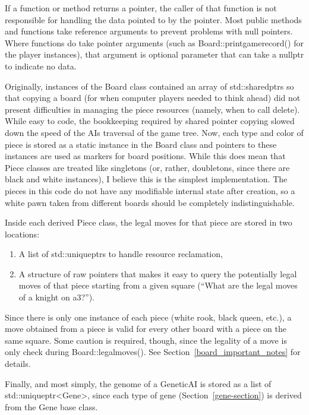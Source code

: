 \documentclass[letterpaper]{article}
\newcommand{\code}[1]{\textsf{#1}}
\renewcommand{\_}{\allowbreak\textunderscore\allowbreak}
\begin{document}
If a function or method returns a pointer, the caller of that function is not responsible for handling the data pointed to by the pointer. Most public methods and functions take reference arguments to prevent problems with null pointers. Where functions do take pointer arguments (such as \code{Board::print\_game\_record()} for the player instances), that argument is optional parameter that can take a \code{nullptr} to indicate no data.

Originally, instances of the \code{Board} class contained an array of \code{std::shared\_ptr}s so that copying a board (for when computer players needed to think ahead) did not present difficulties in managing the piece resources (namely, when to call \code{delete}). While easy to code, the bookkeeping required by shared pointer copying slowed down the speed of the AIs traversal of the game tree. Now, each type and color of piece is stored as a static instance in the \code{Board} class and pointers to these instances are used as markers for board positions. While this does mean that \code{Piece} classes are treated like singletons (or, rather, doubletons, since there are black and white instances), I believe this is the simplest implementation. The pieces in this code do not have any modifiable internal state after creation, so a white pawn taken from different boards should be completely indistinguishable.

Inside each derived \code{Piece} class, the legal moves for that piece are stored in two locations:
\begin{enumerate}
	\item A list of \code{std::unique\_ptr}s to handle resource reclamation,
	\item A structure of raw pointers that makes it easy to query the potentially legal moves of that piece starting from a given square (``What are the legal moves of a knight on a3?'').
\end{enumerate}
Since there is only one instance of each piece (white rook, black queen, etc.), a move obtained from a piece is valid for every other board with a piece on the same square. Some caution is required, though, since the legality of a move is only check during \code{Board::legal\_moves()}. See Section~\ref{board_important_notes} for details.

Finally, and most simply, the genome of a \code{Genetic\_AI} is stored as a list of \code{std::unique\_ptr<Gene>}, since each type of gene (Section~\ref{gene-section}) is derived from the \code{Gene} base class.
\end{document}
